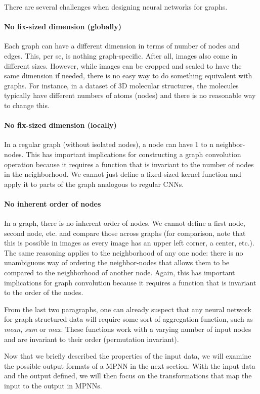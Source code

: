 There are several challenges when designing neural networks for graphs.

\paragraph{No fix-sized dimension (globally)}
Each graph can have a different dimension in terms of number of nodes and edges. This, per se, is nothing graph-specific. After all, images also come in different sizes. However, while images can be cropped and scaled to have the same dimension if needed, there is no easy way to do something equivalent with graphs. For instance, in a dataset of 3D molecular structures, the molecules typically have different numbers of atoms (nodes) and there is no reasonable way to change this.
\paragraph{No fix-sized dimension (locally)}
In a regular graph (without isolated nodes), a node can have 1 to n neighbor-nodes. This has important implications for constructing a graph convolution operation because it requires a function that is invariant to the number of nodes in the neighborhood. We cannot just define a fixed-sized kernel function and apply it to parts of the graph analogous to regular CNNs.
\paragraph{No inherent order of nodes}
In a graph, there is no inherent order of nodes. We cannot define a first node, second node, etc. and compare those across graphs (for comparison, note that this is possible in images as every image has an upper left corner, a center, etc.). The same reasoning applies to the neighborhood of any one node: there is no unambiguous way of ordering the neighbor-nodes that allows them to be compared to the neighborhood of another node. Again, this has important implications for graph convolution because it requires a function that is invariant to the order of the nodes.

From the last two paragraphs, one can already suspect that any neural network for graph structured data will require some sort of aggregation function, such as \textit{mean}, \textit{sum} or  \textit{max}. These functions work with a varying number of input nodes and are invariant to their order (permutation invariant).

Now that we briefly described the properties of the input data, we will examine the possible output formats of a MPNN in the next section. With the input data and the output defined, we will then focus on the transformations that map the input to the output in MPNNs.

